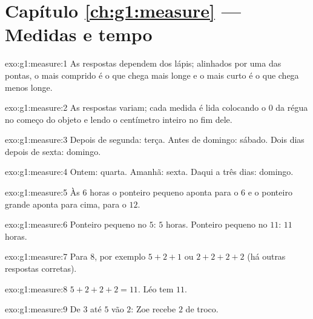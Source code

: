 \section*{Capítulo \ref{ch:g1:measure} --- Medidas e tempo}

\begin{solution}{exo:g1:measure:1}
As respostas dependem dos lápis; alinhados por uma das pontas, o
mais comprido é o que chega mais longe e o mais curto é o que chega
menos longe.
\end{solution}

\begin{solution}{exo:g1:measure:2}
As respostas variam; cada medida é lida colocando o $0$ da régua no
começo do objeto e lendo o centímetro inteiro no fim dele.
\end{solution}

\begin{solution}{exo:g1:measure:3}
Depois de segunda: terça. Antes de domingo: sábado. Dois dias depois
de sexta: domingo.
\end{solution}

\begin{solution}{exo:g1:measure:4}
Ontem: quarta. Amanhã: sexta. Daqui a três dias: domingo.
\end{solution}

\begin{solution}{exo:g1:measure:5}
Às $6$ horas o ponteiro pequeno aponta para o $6$ e o ponteiro
grande aponta para cima, para o $12$.
\end{solution}

\begin{solution}{exo:g1:measure:6}
Ponteiro pequeno no $5$: $5$ horas. Ponteiro pequeno no $11$: $11$
horas.
\end{solution}

\begin{solution}{exo:g1:measure:7}
Para $8$, por exemplo $5 + 2 + 1$ ou $2 + 2 + 2 + 2$ (há outras
respostas corretas).
\end{solution}

\begin{solution}{exo:g1:measure:8}
$5 + 2 + 2 + 2 = 11$. Léo tem $11$.
\end{solution}

\begin{solution}{exo:g1:measure:9}
De $3$ até $5$ vão $2$: Zoe recebe $2$ de troco.
\end{solution}
